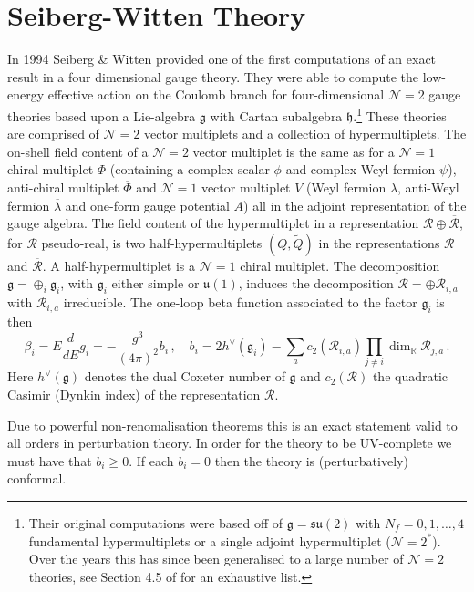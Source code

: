 \documentclass[main.tex]{subfiles}
\begin{document}
\section{Seiberg-Witten Theory}\label{eqn:introSW}
In 1994 Seiberg \& Witten provided one of the first computations of an exact result in a four dimensional gauge theory. They were able to compute the low-energy effective action on the Coulomb branch for four-dimensional $\mathcal{N}=2$ gauge theories based upon a Lie-algebra $\mathfrak{g}$ \cite{Seiberg:1994rs,Seiberg:1994aj} with Cartan subalgebra $\mathfrak{h}$.\footnote{Their original computations were based off of $\mathfrak{g}=\mathfrak{su}(2)$ with $N_f=0,1,\dots,4$ fundamental hypermultiplets or a single adjoint hypermultiplet ($\mathcal{N}=2^*$).  Over the years this has since been generalised to a large number of $\mathcal{N}=2$ theories, see Section 4.5 of \cite{Bhardwaj:2013qia} for an exhaustive list.} These theories are comprised of $\mathcal{N}=2$ vector multiplets and a collection of hypermultiplets.  The on-shell field content of a $\mathcal{N}=2$ vector multiplet is the same as for a $\mathcal{N}=1$ chiral multiplet $\Phi$ (containing a complex scalar $\phi$ and complex Weyl fermion $\psi$), anti-chiral multiplet $\overline{\Phi}$ and $\mathcal{N}=1$ vector multiplet $V$ (Weyl fermion $\lambda$, anti-Weyl fermion $\overline{\lambda}$ and one-form gauge potential $A$) all in the adjoint representation of the gauge algebra.  The field content of the hypermultiplet in a representation $\mathcal{R}\oplus\overline{\mathcal{R}}$, for $\mathcal{R}$ pseudo-real, is two half-hypermultiplets $(Q,\widetilde{Q})$ in the representations $\mathcal{R}$ and $\overline{\mathcal{R}}$.  A half-hypermultiplet is a $\mathcal{N}=1$ chiral multiplet.  The decomposition $\mathfrak{g}=\oplus_i\mathfrak{g}_i$, with $\mathfrak{g}_i$ either simple or $\mathfrak{u}(1)$, induces the decomposition $\mathcal{R}=\oplus \mathcal{R}_{i,a}$ with $\mathcal{R}_{i,a}$ irreducible.  The one-loop beta function associated to the factor $\mathfrak{g}_i$ is then
\begin{equation}
\beta_i=E\frac{d}{dE}g_i=-\frac{g^3}{(4\pi)^2}b_i\,,\quad b_i=2h^{\vee}(\mathfrak{g}_i)-\sum_{a}c_2(\mathcal{R}_{i,a})\prod_{j\neq i}\dim_{\mathbb{R}}\mathcal{R}_{j,a}\,.
\end{equation}
Here $h^{\vee}({\mathfrak{g}})$ denotes the dual Coxeter number of $\mathfrak{g}$ and $c_2(\mathcal{R})$ the quadratic Casimir (Dynkin index) of the representation $\mathcal{R}$.

Due to powerful non-renomalisation theorems \cite{Grisaru:1979wc,Seiberg:1994bp,Seiberg:1993vc,Seiberg:1988ur} this is an exact statement valid to all orders in perturbation theory.  In order for the theory to be UV-complete we must have that $b_i\geq0$.  If each $b_i=0$ then the theory is (perturbatively) conformal.
\end{document}
